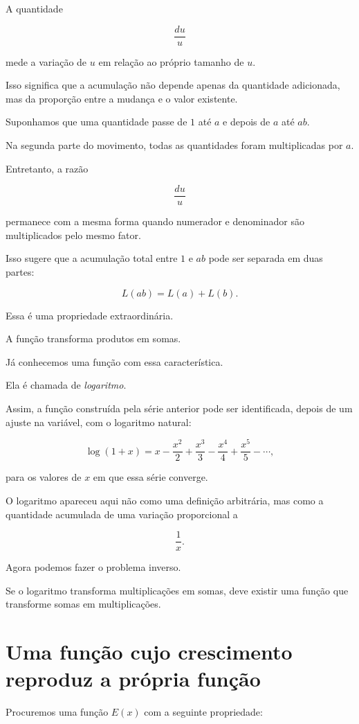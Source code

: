 \documentclass[12pt,a4paper]{article}
\begin{document}
A quantidade

\[
\frac{du}{u}
\]

mede a variação de \(u\) em relação ao próprio tamanho de \(u\).

Isso significa que a acumulação não depende apenas da quantidade
adicionada, mas da proporção entre a mudança e o valor existente.

Suponhamos que uma quantidade passe de \(1\) até \(a\) e depois de
\(a\) até \(ab\).

Na segunda parte do movimento, todas as quantidades foram multiplicadas
por \(a\).

Entretanto, a razão

\[
\frac{du}{u}
\]

permanece com a mesma forma quando numerador e denominador são
multiplicados pelo mesmo fator.

Isso sugere que a acumulação total entre \(1\) e \(ab\) pode ser
separada em duas partes:

\[
L(ab)=L(a)+L(b).
\]

Essa é uma propriedade extraordinária.

A função transforma produtos em somas.

Já conhecemos uma função com essa característica.

Ela é chamada de \emph{logaritmo}.

Assim, a função construída pela série anterior pode ser identificada,
depois de um ajuste na variável, com o logaritmo natural:

\[
\log(1+x)
=
x-\frac{x^2}{2}
+\frac{x^3}{3}
-\frac{x^4}{4}
+\frac{x^5}{5}
-\cdots,
\]

para os valores de \(x\) em que essa série converge.

O logaritmo apareceu aqui não como uma definição arbitrária, mas como a
quantidade acumulada de uma variação proporcional a

\[
\frac{1}{x}.
\]

Agora podemos fazer o problema inverso.

Se o logaritmo transforma multiplicações em somas, deve existir uma
função que transforme somas em multiplicações.

\section{Uma função cujo crescimento reproduz a própria função}

Procuremos uma função \(E(x)\) com a seguinte propriedade:
\end{document}
